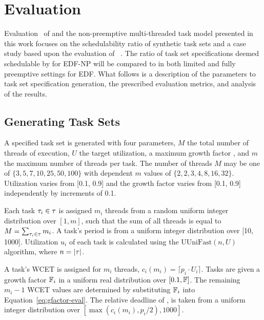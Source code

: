 \section{Evaluation}\label{sec:eval}
\renewcommand{\tex}[1]{70-evaluation/#1}

Evaluation~\cite{NPM-Artifact:2019} of \tpj{} and the non-preemptive
multi-threaded task model presented in this work focuses on the
schedulability ratio of synthetic task sets and a case study based
upon the evaluation of \bundlep{}~\cite{Tessler:2018b}. The ratio of
task set specifications deemed schedulable by \tpj{} for EDF-NP will
be compared to \npchunks{} in both limited and fully preemptive
settings for EDF. What follows is a description of the parameters to
task set specification generation, the prescribed evaluation metrics,
and analysis of the results. 

\subsection{Generating Task Sets}

A specified task set \tasks{} is generated with four parameters,
${M}$ the total number of threads of execution, ${U}$ the target
utilization, a maximum growth factor \GFactor{}, and ${m}$ the maximum
number of threads per task. The number of threads ${M}$ may be one of
${\{3, 5, 7, 10, 25, 50, 100\}}$ with dependent ${m}$ values of
${\{2, 2, 3, 4, 8, 16, 32\}}$. Utilization varies from [0.1, 0.9]
and the growth factor varies from [0.1, 0.9] independently by
increments of 0.1. 

Each task ${\tau_{i} \in \tau{}}$ is assigned ${m_i}$ threads from
a random uniform integer distribution over ${[1, m]}$, such that the
sum of all threads is equal to ${M = \sum_{\tau_{i} \in \tau{}}
  m_i}$. A task's period  is from a uniform integer
distribution over [10, 1000]. Utilization ${u_i}$ of each task
 is calculated using the ${\text{UUniFast}(n,
  U)}$~\cite{Bini:2004} algorithm, where ${n = |\tau{}|}$.

A task's WCET is assigned for ${m_i}$ threads,
${c_i(m_i) = \lceil p_i \cdot U_i \rceil}$. Tasks
are given a growth factor ${\mathbb{F}{}_i}$ in a uniform real
distribution over ${[0.1, \mathbb{F}{}]}$.  The remaining ${m_i - 1}$
WCET values are determined by substituting ${\mathbb{F}{}_i}$ into
Equation~\ref{eq:gfactor-eval}. The relative deadline of ,
 is taken from a uniform integer distribution over
${[\max(c_i(m_i),p_i/2), 1000]}$.

